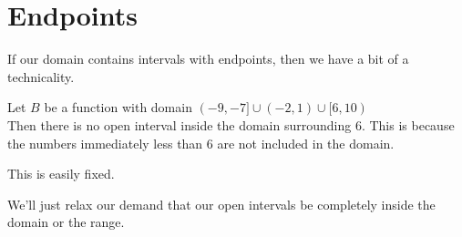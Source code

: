 \documentclass{ximera}
\begin{document}
\section{Endpoints}


If our domain contains intervals with endpoints, then we have a bit of a technicality.

Let $B$ be a function with domain $(-9, -7] \cup (-2, 1) \cup [6, 10)$ \\

Then there is no open interval inside the domain surrounding $6$.  This is because the numbers immediately less than $6$ are not included in the domain.


This is easily fixed.


We'll just relax our demand that our open intervals be completely inside the domain or the range.
\end{document}

